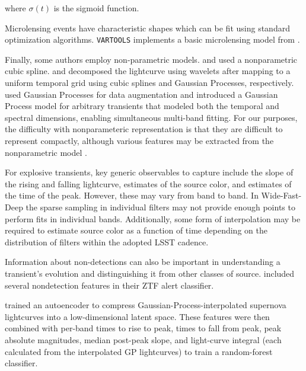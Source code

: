 \documentclass[DM,authoryear,toc]{lsstdoc}
\begin{document}
where $\sigma(t)$ is the sigmoid function.


Microlensing events have characteristic shapes which can be fit using standard optimization algorithms.
\texttt{VARTOOLS} implements a basic microlensing model from \citet{Wozniak:01:Microlensing}.

Finally, some authors employ non-parametric models.
\citet{Richards:12:SemiSupervisedSNe} and \citet{Ishida:13:PCASNClassification} used a nonparametric cubic spline.
\citet{Varughese:15:SNPhotCC} and \citet{Lochner:16:SNPhotCC} decomposed the lightcurve using wavelets after mapping to a uniform temporal grid using cubic splines and Gaussian Processes, respectively.
\citet{Revsbech:18:SNGP} used Gaussian Processes for data augmentation and \citet{Boone:19:AvocadoClassifier} introduced a Gaussian Process model for arbitrary transients that modeled both the temporal and spectral dimensions, enabling simultaneous multi-band fitting.
For our purposes, the difficulty with nonparameteric representation is that they are difficult to represent compactly, although various features may be extracted from the nonparametric model \citep[e.g.,][]{Boone:19:AvocadoClassifier}.

For explosive transients, key generic observables to capture include the slope of the rising and falling lightcurve, estimates of the source color, and estimates of the time of the peak.
However, these may vary from band to band.
In Wide-Fast-Deep the sparse sampling in individual filters may not provide enough points to perform fits in individual bands.
Additionally, some form of interpolation may be required to estimate source color as a function of time depending on the distribution of filters within the adopted LSST cadence.

Information about non-detections can also be important in understanding a transient's evolution and distinguishing it from other classes of source.
\citet{Sanchez-Saez:21:AlertClassification} included several nondetection features in their ZTF alert classifier.

\citet{tmp_Villar:20:SuperRAENN} trained an autoencoder to compress Gaussian-Process-interpolated supernova lightcurves into a low-dimensional latent space.  
These features were then combined with per-band times to rise to peak, times to fall from peak, peak absolute magnitudes, median post-peak slope, and light-curve integral (each calculated from the interpolated GP lightcurves) to train a random-forest classifier.
\end{document}
